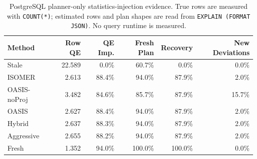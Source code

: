 \begin{table}[t]
  \centering
  \small
  \caption{PostgreSQL planner-only statistics-injection evidence. True rows are measured with \texttt{COUNT(*)}; estimated rows and plan shapes are read from \texttt{EXPLAIN (FORMAT JSON)}. No query runtime is measured.}
  \label{tab:postgres_planner_stats_injection}
  \setlength{\tabcolsep}{4pt}
  \begin{tabular}{lrrrrr}
    \toprule
    Method & Row QE & QE Imp. & Fresh Plan & Recovery & New Deviations \\
    \midrule
    Stale & 22.589 & 0.0\% & 60.7\% & 0.0\% & 0.0\% \\
    ISOMER & 2.613 & 88.4\% & 94.0\% & 87.9\% & 2.0\% \\
    OASIS-noProj & 3.482 & 84.6\% & 85.7\% & 87.9\% & 15.7\% \\
    OASIS & 2.627 & 88.4\% & 94.0\% & 87.9\% & 2.0\% \\
    Hybrid & 2.637 & 88.3\% & 94.0\% & 87.9\% & 2.0\% \\
    Aggressive & 2.655 & 88.2\% & 94.0\% & 87.9\% & 2.0\% \\
    Fresh & 1.352 & 94.0\% & 100.0\% & 100.0\% & 0.0\% \\
    \bottomrule
  \end{tabular}
\end{table}
